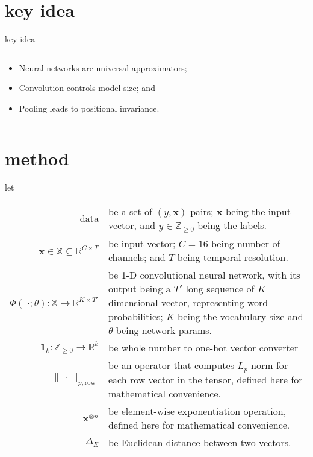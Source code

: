 \documentclass[aspectratio=169,xcolor={dvipsnames,svgnames}]{beamer}
\begin{document}
\section{key idea}
\label{sec:org1802fba}
\begin{frame}[label={sec:key-idea}]{key idea}
\begin{columns}
\begin{column}{.7\columnwidth}
\begin{itemize}
\item Neural networks are universal approximators;
\item Convolution controls model size; and
\item Pooling leads to positional invariance.
\end{itemize}
\end{column}
\end{columns}
\end{frame}

\section{method}
\label{sec:orgcae4c93}
\begin{frame}[label={sec:method}]{let}
\begin{center}
\begin{tabularx}{\linewidth}{rX}
\(\text{data}\) & be a set of \((y,\mathbf{x})\) pairs; \(\mathbf{x}\) being the input vector, and \(y\in\mathbb{Z}_{\geqslant0}\) being the labels.\\[0pt]
\(\mathbf{x}\in\mathbb{X}\subseteq\mathbb{R}^{C\times T}\) & be input vector; \(C=16\) being number of channels; and \(T\) being temporal resolution.\\[0pt]
\(\Phi(\;\cdot;\theta):\mathbb{X}\to\mathbb{R}^{K\times T'}\) & be 1-D convolutional neural network, with its output being a \(T'\) long sequence of \(K\) dimensional vector, representing word probabilities; \(K\) being the vocabulary size and \(\theta\) being network params.\\[0pt]
\(\boldsymbol{1}_{k}:\mathbb{Z}_{\geqslant0}\to\mathbb{R}^{k}\) & be whole number to one-hot vector converter\\[0pt]
\(\parallel\,\cdot\,\parallel_{p,\mathrm{row}}\) & be an operator that computes \(L_{p}\) norm for each row vector in the tensor, defined here for mathematical convenience.\\[0pt]
\(\mathbf{x}^{\otimes n}\) & be element-wise exponentiation operation, defined here for mathematical convenience.\\[0pt]
\(\Delta_{E}\) & be Euclidean distance between two vectors.\\[0pt]
\end{tabularx}
\end{center}
\end{frame}
\end{document}
